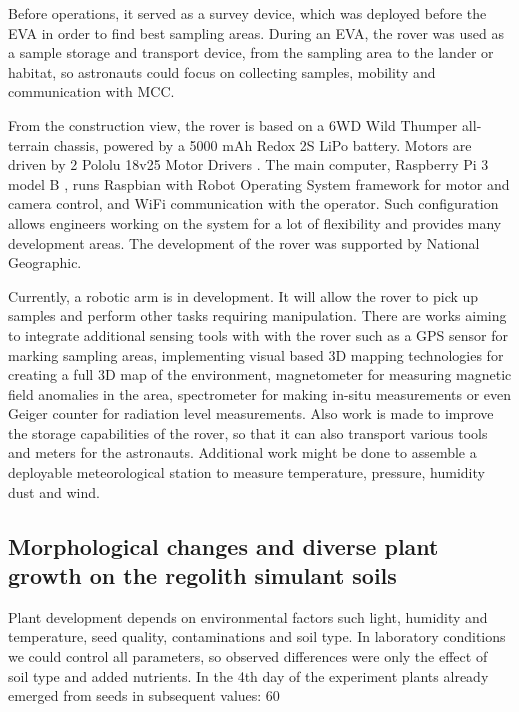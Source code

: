 \documentclass[preprint]{elsarticle}
\begin{document}
Before operations, it served as a survey device, which was deployed before the EVA in order to find best sampling areas. During an EVA, the rover was used as a sample storage and transport device, from the sampling area to the lander or habitat, so astronauts could focus on collecting samples, mobility and communication with MCC.

From the construction view, the rover is based on a 6WD Wild Thumper \cite{ref27} all-terrain chassis, powered by a 5000 mAh Redox 2S LiPo battery. Motors are driven by 2 Pololu 18v25 Motor Drivers \cite{ref26}. The main computer, Raspberry Pi 3 model B \cite{ref25}, runs Raspbian with Robot Operating System framework \cite{ref24} for motor and camera control, and WiFi communication with the operator. Such configuration allows engineers working on the system for a lot of flexibility and provides many development areas. The development of the rover was supported by National Geographic.

Currently, a robotic arm is in development. It will allow the rover to pick up samples and perform other tasks requiring manipulation. There are works aiming to integrate additional sensing tools with with the rover such as a GPS sensor for marking sampling areas, implementing visual based 3D mapping technologies for creating a full 3D map of the environment, magnetometer for measuring magnetic field anomalies in the area, spectrometer for making in-situ measurements or even Geiger counter for radiation level measurements. Also work is made to improve the storage capabilities of the rover, so that it can also transport various tools and meters for the astronauts. Additional work might be done to assemble a deployable meteorological station to measure temperature, pressure, humidity dust and wind.

\subsection{Morphological changes and diverse plant growth on the regolith simulant soils}
Plant development depends on environmental factors such light, humidity and temperature, seed quality, contaminations and soil type. In laboratory conditions we could control all parameters, so observed differences were only the effect of soil type and added nutrients. In the 4th day of the experiment plants already emerged from seeds in subsequent values: 60%
\end{document}
